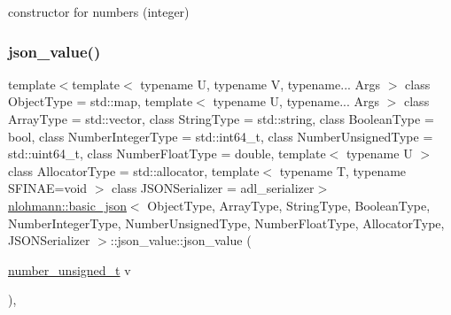 constructor for numbers (integer) 

\mbox{\label{unionnlohmann_1_1basic__json_1_1json__value_a0bac352145b02ec3dd280bbfef997a55}} 
\subsubsection{\texorpdfstring{json\_value()}{json\_value()}\hspace{0.1cm}{\footnotesize\ttfamily [4/12]}}
{\footnotesize\ttfamily template$<$template$<$ typename U, typename V, typename... Args $>$ class Object\+Type = std\+::map, template$<$ typename U, typename... Args $>$ class Array\+Type = std\+::vector, class String\+Type  = std\+::string, class Boolean\+Type  = bool, class Number\+Integer\+Type  = std\+::int64\+\_\+t, class Number\+Unsigned\+Type  = std\+::uint64\+\_\+t, class Number\+Float\+Type  = double, template$<$ typename U $>$ class Allocator\+Type = std\+::allocator, template$<$ typename T, typename S\+F\+I\+N\+A\+E=void $>$ class J\+S\+O\+N\+Serializer = adl\+\_\+serializer$>$ \\
\mbox{\hyperlink{classnlohmann_1_1basic__json}{nlohmann\+::basic\+\_\+json}}$<$ Object\+Type, Array\+Type, String\+Type, Boolean\+Type, Number\+Integer\+Type, Number\+Unsigned\+Type, Number\+Float\+Type, Allocator\+Type, J\+S\+O\+N\+Serializer $>$\+::json\+\_\+value\+::json\+\_\+value (\begin{DoxyParamCaption}\item[{\mbox{\hyperlink{classnlohmann_1_1basic__json_ab906e29b5d83ac162e823ada2156b989}{number\+\_\+unsigned\+\_\+t}}}]{v }\end{DoxyParamCaption})\hspace{0.3cm}{\ttfamily [inline]}, {\ttfamily [noexcept]}}



